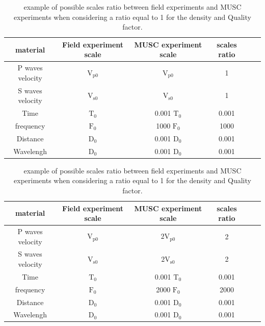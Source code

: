 \documentclass[manuscript,revised]{geophysics}
\begin{document}
\begin{table}[!ht]
	\centering
	\begin{tabular}{cccccc}
		\hline
		material & Field experiment scale & MUSC experiment scale & scales ratio  \\
		\hline
		P waves velocity & $\mathrm{V_{p 0}}$ & $\mathrm{V_{p 0}}$  & 1  \\
		S waves velocity & $\mathrm{V_{s 0}}$ &  $\mathrm{V_{s 0}}$ & 1   \\
		Time & $\mathrm{T_{0}}$    & 0.001 $\mathrm{T_{0}}$ & 0.001  \\
		frequency   & $\mathrm{F_{0}}$  & 1000 $\mathrm{F_{0}}$ & 1000  \\
		Distance   & $\mathrm{D_{0}}$  & 0.001 $\mathrm{D_{0}}$ & 0.001   \\
		Wavelengh   & $\mathrm{D_{0}}$ & 0.001 $\mathrm{D_{0}}$ & 0.001  \\
		\hline
	\end{tabular}
	\caption{ example of possible scales ratio between field experiments and MUSC experiments when considering a ratio equal to 1 for the density and Quality factor.}
	\label{epoxy-resin}
\end{table}

\begin{table}[!ht]
	\centering
	\begin{tabular}{cccccc}
		\hline
		material & Field experiment scale & MUSC experiment scale & scales ratio  \\
		\hline
		P waves velocity & $\mathrm{V_{p 0}}$ & $\mathrm{2V_{p 0}}$  & 2  \\
		S waves velocity & $\mathrm{V_{s 0}}$ &  $\mathrm{2V_{s 0}}$ & 2   \\
		Time & $\mathrm{T_{0}}$    & 0.001 $\mathrm{T_{0}}$ & 0.001  \\
		frequency   & $\mathrm{F_{0}}$  & 2000 $\mathrm{F_{0}}$ & 2000  \\
		Distance   & $\mathrm{D_{0}}$  & 0.001 $\mathrm{D_{0}}$ & 0.001   \\
		Wavelengh   & $\mathrm{D_{0}}$ & 0.001 $\mathrm{D_{0}}$ & 0.001  \\
		\hline
	\end{tabular}
	\caption{ example of possible scales ratio between field experiments and MUSC experiments when considering a ratio equal to 1 for the density and Quality factor.}
	\label{epoxy-resin}
\end{table}
\end{document}
